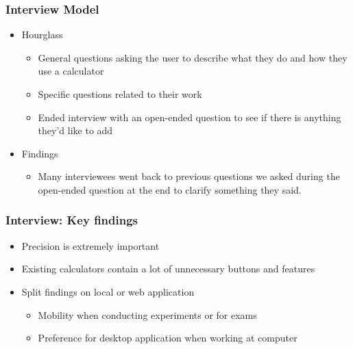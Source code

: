 \documentclass{beamer}
\begin{document}
\begin{frame}
\frametitle{Interview Model}
\begin{itemize}
 \item Hourglass
  \begin{itemize}
   \item General questions asking the user to describe what they do and how they use a calculator
   \item Specific questions related to their work
   \item Ended interview with an open-ended question to see if there is anything they'd like to add
  \end{itemize}
 \item Findings
  \begin{itemize}
   \item Many interviewees went back to previous questions we asked during the open-ended question at the end to clarify something they said.
  \end{itemize}
\end{itemize}
\end{frame}


\begin{frame}
\frametitle{Interview: Key findings}
\begin{itemize}
 \item Precision is extremely important
 \item Existing calculators contain a lot of unnecessary buttons and features
 \item Split findings on local or web application
  \begin{itemize}
   \item Mobility when conducting experiments or for exams
   \item Preference for desktop application when working at computer
  \end{itemize}
\end{itemize}
\end{frame}
\end{document}

